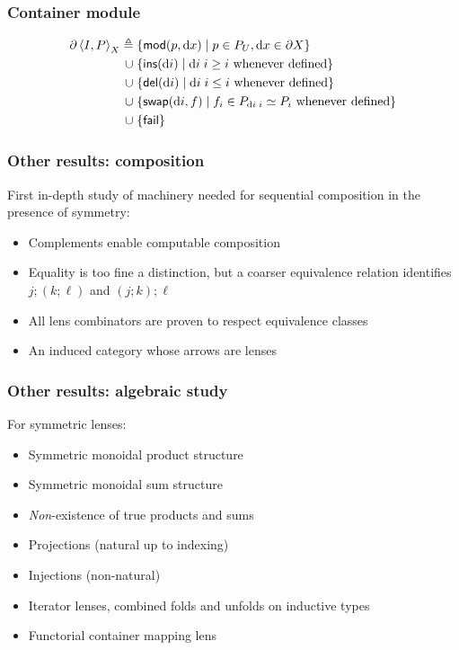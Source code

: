 \documentclass[table]{beamer}
\begin{document}
\begin{frame}
    \frametitle{Container module}
    \begin{align*}
        \partial\left<I,P\right>_X
            \triangleq{}&
                \{\mathsf{mod}(p,\textrm{d} x) \mid p \in P_U, \textrm{d} x \in \partial X\}
            \\ \mathrel{\cup}{}&
                \{\mathsf{ins}(\textrm{d} i) \mid \textrm{d} i\;i \ge i\mbox{ whenever defined}\}
            \\ \mathrel{\cup}{}&
                \{\mathsf{del}(\textrm{d} i) \mid \textrm{d} i\;i \le i\mbox{ whenever defined}\}
            \\ \mathrel{\cup}{}&
                \{\mathsf{swap}(\textrm{d} i,f) \mid f_i \in P_{\textrm{d} i\;i} \simeq P_i
                \mbox{ whenever defined} \}
            \\ \mathrel{\cup}{}&
                \{\mathsf{fail}\}
    \end{align*}
\end{frame}

\begin{frame}
    \frametitle{Other results: composition}
    First in-depth study of machinery needed for sequential composition in
    the presence of symmetry:
    \begin{itemize}
        \item Complements enable computable composition
        \item Equality is too fine a distinction, but a coarser equivalence
            relation identifies $j;(k;\ell)$ and $(j;k);\ell$
        \item All lens combinators are proven to respect equivalence classes
        \item An induced category whose arrows are lenses
    \end{itemize}
\end{frame}

\begin{frame}
    \frametitle{Other results: algebraic study}
    For symmetric lenses:
    \begin{itemize}
        \item Symmetric monoidal product structure
        \item Symmetric monoidal sum structure
        \item \emph{Non}-existence of true products and sums
        \item Projections (natural up to indexing)
        \item Injections (non-natural)
        \item Iterator lenses, combined folds and unfolds on inductive types
        \item Functorial container mapping lens
    \end{itemize}
\end{frame}
\end{document}
